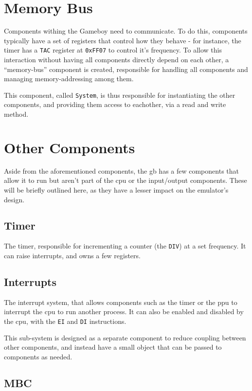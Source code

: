\documentclass[11pt]{report}
\begin{document}
\section{Memory Bus}

Components withing the Gameboy need to communicate. To do this, components typically have a set of registers that control how they behave - for instance, the timer has a \texttt{TAC} register at \texttt{0xFF07} to control it's frequency. To allow this interaction without having all components directly depend on each other, a ``memory-bus'' component is created, responsible for handling all components and managing memory-addressing among them.

This component, called \texttt{System}, is thus responsible for instantiating the other components, and providing them access to eachother, via a read and write method.

\section{Other Components}

Aside from the aforementioned components, the \gls{gb} has a few components that allow it to run but aren't part of the \gls{cpu} or the input/output components. These will be briefly outlined here, as they have a lesser impact on the emulator's design.

\subsection{Timer}

The timer, responsible for incrementing a counter (the \texttt{DIV}) at a set frequency. It can raise interrupts, and owns a few registers.

\subsection{Interrupts}

The interrupt system, that allows components such as the timer or the \gls{ppu} to interrupt the \gls{cpu} to run another process. It can also be enabled and disabled by the \gls{cpu}, with the \texttt{EI} and \texttt{DI} instructions.

This sub-system is designed as a separate component to reduce coupling between other components, and instead have a small object that can be passed to components as needed.

\subsection{MBC}
\end{document}
